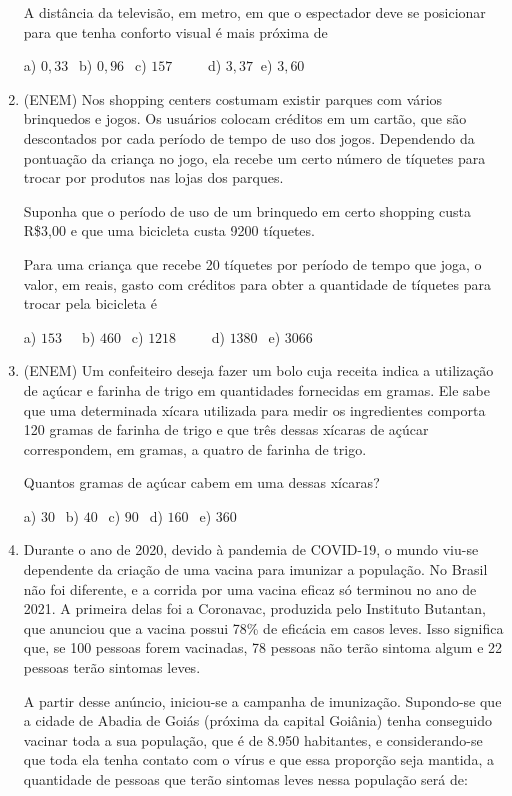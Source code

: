 \begin{multicols*}{2}
\begin{enumerate}
A distância da televisão, em metro, em que o espectador deve se posicionar para que tenha conforto visual é mais
próxima de

		a) $0,33 \ \ $ b) $0,96 \ \ $ c) $157 \ \ \ \ \ \ \ \ \ \ $ d) $3,37 \ $ e) $3,60 \ \ $

			\item (ENEM) Nos shopping centers costumam existir parques com vários brinquedos e jogos. Os usuários
colocam créditos em um cartão, que são descontados por cada período de tempo de uso dos jogos. Dependendo da
pontuação da criança no jogo, ela recebe um certo número de tíquetes para trocar por produtos nas lojas dos parques.

Suponha que o período de uso de um brinquedo em certo shopping custa R\$3,00 e que uma bicicleta custa 9200 tíquetes.

Para uma criança que recebe 20 tíquetes por período de tempo que joga, o valor, em reais, gasto com créditos para
obter a quantidade de tíquetes para trocar pela bicicleta é

		a) $153 \ \ \ \ \ $ b) $460 \ \ $ c) $1218 \ \ \ \ \ \ \ \ \ \ $ d) $1380 \ \ $ e) $3066 \ \ $

			\item (ENEM) Um confeiteiro deseja fazer um bolo cuja receita indica a utilização de açúcar e farinha de trigo em
quantidades fornecidas em gramas. Ele sabe que uma determinada xícara utilizada para medir os ingredientes
comporta 120 gramas de farinha de trigo e que três dessas xícaras de açúcar correspondem, em gramas, a quatro de
farinha de trigo.

Quantos gramas de açúcar cabem em uma dessas xícaras?

		a) $30 \ \ $ b) $40 \ \ $ c) $90 \ \ $ d) $160 \ \ $ e) $360 \ \ $

			\item Durante o ano de 2020, devido à pandemia de COVID-19, o mundo viu-se dependente da criação de uma vacina para imunizar a população. No Brasil não foi diferente, e a corrida por uma vacina eficaz só terminou no ano de 2021. A primeira delas foi a Coronavac, produzida pelo Instituto Butantan, que anunciou que a vacina possui 78\% de eficácia em casos leves. Isso significa que, se 100 pessoas forem vacinadas, 78 pessoas não terão sintoma algum e 22 pessoas terão sintomas leves.

A partir desse anúncio, iniciou-se a campanha de imunização. Supondo-se que a cidade de Abadia de Goiás (próxima da capital Goiânia) tenha conseguido vacinar toda a sua população, que é de 8.950 habitantes, e considerando-se que toda ela tenha contato com o vírus e que essa proporção seja mantida, a quantidade de pessoas que terão sintomas leves nessa população será de:


\end{enumerate}
\end{multicols*}
